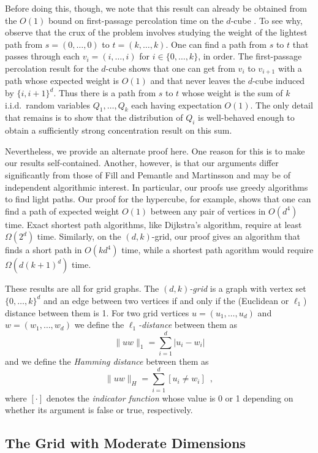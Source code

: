 \documentclass{patmorin}
\begin{document}
Before doing this, though, we note that this result can already be
obtained from the $O(1)$ bound on first-passage percolation time on the
$d$-cube \cite{fill.pemantle:percolation, martinsson:unoriented}.  To see
why, observe that the crux of the problem involves studying the weight
of the lightest path from $s=(0,\ldots,0)$ to $t=(k,\ldots,k)$. One can
find a path from $s$ to $t$ that passes through each $v_i=(i,\ldots,i)$
for $i\in\{0,\ldots,k\}$, in order.  The first-passage percolation
result for the $d$-cube shows that one can get from $v_i$ to $v_{i+1}$
with a path whose expected weight is $O(1)$ and that never leaves the
$d$-cube induced by $\{i,i+1\}^d$.  Thus there is a path from $s$ to $t$
whose weight is the sum of $k$ i.i.d.\ random variables $Q_1,\ldots,Q_k$
each having expectation $O(1)$. The only detail that remains is to
show that the distribution of $Q_i$ is well-behaved enough to obtain a
sufficiently strong concentration result on this sum.

Nevertheless, we provide an alternate proof here.  One reason for
this is to make our results self-contained.  Another, however,
is that our arguments differ significantly from those of Fill
and Pemantle \cite{fill.pemantle:percolation} and Martinsson
\cite{martinsson:unoriented} and may be of independent algorithmic
interest.  In particular, our proofs use greedy algorithms to find
light paths.  Our proof for the hypercube, for example, shows that one
can find a path of expected weight $O(1)$ between any pair of vertices in
$O(d^4)$ time.  Exact shortest path algorithms, like Dijkstra's algorithm,
require at least $\Omega(2^d)$ time.  Similarly, on the $(d,k)$-grid,
our proof gives an algorithm that finds a short path in $O(kd^4)$ time,
while a shortest path agorithm would require $\Omega(d(k+1)^d)$ time.

These results are all for grid graphs.  The \emph{$(d,k)$-grid} is a graph
with
vertex set $\{0,\ldots,k\}^d$ and an edge between two vertices if
and only if the (Euclidean or $\ell_1$) distance between them is 1.
For two grid vertices $u=(u_1,\ldots,u_d)$ and $w=(w_1,\ldots,w_d)$
we define the \emph{$\ell_1$-distance} between them as
\[
   \|uw\|_1 = \sum_{i=1}^d |u_i-w_i|
\]
and we define the \emph{Hamming distance} between them as
\[
   \|uw\|_H = \sum_{i=1}^d [u_i\neq w_i] \enspace ,
\]
where $[\cdot]$ denotes the \emph{indicator function} whose value is 0
or 1 depending on whether its argument is false or true, respectively.

\subsection{The Grid with Moderate Dimensions}
\end{document}
